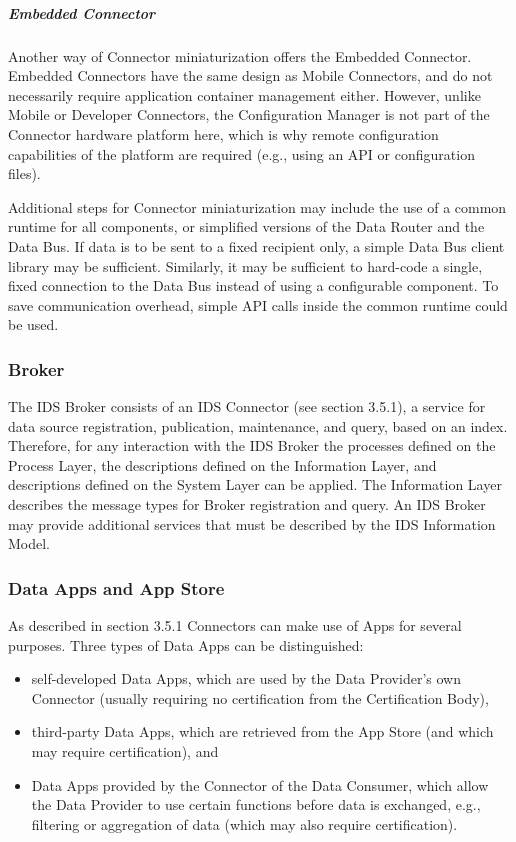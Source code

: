 \subparagraph*{Embedded Connector}
Another way of Connector miniaturization offers the Embedded Connector. Embedded Connectors have the same design as Mobile Connectors, and do not necessarily require application container management either. However, unlike Mobile or Developer Connectors, the Configuration Manager is not part of the Connector hardware platform here, which is why remote configuration capabilities of the platform are required (e.g., using an API or configuration files).

Additional steps for Connector miniaturization may include the use of a common runtime for all components, or simplified versions of the Data Router and the Data Bus. If data is to be sent to a fixed recipient only, a simple Data Bus client library may be sufficient. Similarly, it may be sufficient to hard-code a single, fixed connection to the Data Bus instead of using a configurable component. To save communication overhead, simple API calls inside the common runtime could be used.

\subsubsection{Broker}
The IDS Broker consists of an IDS Connector (see section 3.5.1), a service for data source registration, publication, maintenance, and query, based on an index. Therefore, for any interaction with the IDS Broker the processes defined on the Process Layer, the descriptions defined on the Information Layer, and descriptions defined on the System Layer can be applied. The Information Layer describes the message types for Broker registration and query. An IDS Broker may provide additional services that must be described by the IDS Information Model. 

\subsubsection{Data Apps and App Store}
As described in section 3.5.1 Connectors can make use of Apps for several purposes. Three types of Data Apps can be distinguished:

\begin{itemize}
	\item self-developed Data Apps, which are used by the Data Provider's own Connector (usually requiring no certification from the Certification Body),

	\item third-party Data Apps, which are retrieved from the App Store (and which may require certification), and

	\item Data Apps provided by the Connector of the Data Consumer, which allow the Data Provider to use certain functions before data is exchanged, e.g., filtering or aggregation of data (which may also require certification).
\end{itemize}

